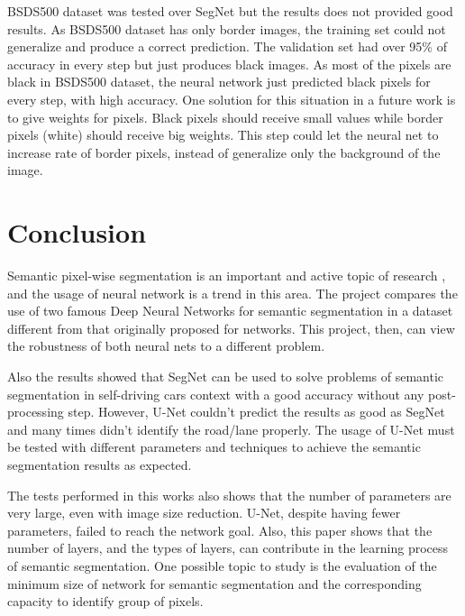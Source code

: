 \documentclass[10pt,twocolumn,letterpaper]{article}
\begin{document}
BSDS500 dataset was tested over SegNet but the results does not provided good results. As BSDS500 dataset has only border images, the training set could not generalize and produce a correct prediction. The validation set had over 95\% of accuracy in every step but just produces black images. As most of the pixels are black in BSDS500 dataset, the neural network just predicted black pixels for every step, with high accuracy. One solution for this situation in a future work is to give weights for pixels. Black pixels should receive small values while border pixels (white) should receive big weights. This step could let the neural net to increase rate of border pixels, instead of generalize only the background of the image.

\section{Conclusion} \label{sec:conclusion}


Semantic pixel-wise segmentation is an important and active topic of research \cite{SEGNET}, and the usage of neural network is a trend in this area. The project compares the use of two famous Deep Neural Networks for semantic segmentation in a dataset different from that originally proposed for networks. This project, then, can view the robustness of both neural nets to a different problem. 

Also the results showed that SegNet can be used to solve problems of semantic segmentation in self-driving cars context with a good accuracy without any post-processing step. However, U-Net couldn't predict the results as good as SegNet and many times didn't identify the road/lane properly. The usage of U-Net must be tested with different parameters and techniques to achieve the semantic segmentation results as expected.

The tests performed in this works also shows that the number of parameters are very large, even with image size reduction. U-Net, despite having fewer parameters, failed to reach the network goal. Also, this paper shows that the number of layers, and the types of layers, can contribute in the learning process of semantic segmentation. One possible topic to study is the evaluation of the minimum size of network for semantic segmentation and the corresponding capacity to identify group of pixels.
\end{document}
